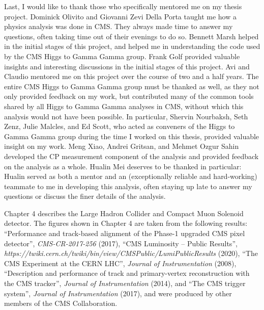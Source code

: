 \begin{frontmatter}
\begin{acknowledgements}
    Last, I would like to thank those who specifically mentored me on my thesis project.
    Dominick Olivito and Giovanni Zevi Della Porta taught me how a physics analysis was done in CMS. They always made time to answer my questions, often taking time out of their evenings to do so.
    Bennett Marsh helped in the initial stages of this project, and helped me in understanding the code used by the CMS Higgs to Gamma Gamma group.
    Frank Golf provided valuable insights and interesting discussions in the initial stages of this project.
    Avi and Claudio mentored me on this project over the course of two and a half years.
    The entire CMS Higgs to Gamma Gamma group must be thanked as well, as they not only provided feedback on my work, but contributed many of the common tools shared by all Higgs to Gamma Gamma analyses in CMS, without which this analysis would not have been possible.
    In particular, Shervin Nourbaksh, Seth Zenz, Julie Malcles, and Ed Scott, who acted as conveners of the Higgs to Gamma Gamma group during the time I worked on this thesis, provided valuable insight on my work.
    Meng Xiao, Andrei Gritsan, and Mehmet Ozgur Sahin developed the CP measurement component of the analysis and provided feedback on the analysis as a whole.
    Hualin Mei deserves to be thanked in particular: Hualin served as both a mentor and an (exceptionally reliable and hard-working) teammate to me in developing this analysis, often staying up late to answer my questions or discuss the finer details of the analysis.

    Chapter 4 describes the Large Hadron Collider and Compact Muon Solenoid detector.
    The figures shown in Chapter 4 are taken from the following results: ``Performance and track-based alignment of the Phase-1 upgraded CMS pixel detector'', \emph{CMS-CR-2017-256} (2017), ``CMS Luminosity -- Public Results'', \emph{https://twiki.cern.ch/twiki/bin/view/CMSPublic/LumiPublicResults} (2020), ``The CMS Experiment at the CERN LHC'', \emph{Journal of Instrumentation} (2008), ``Description and performance of track and primary-vertex reconstruction with the CMS tracker'', \emph{Journal of Instrumentation} (2014), and ``The CMS trigger system'', \emph{Journal of Instrumentation} (2017), and were produced by other members of the CMS Collaboration.
    

\end{acknowledgements}
\end{frontmatter}
